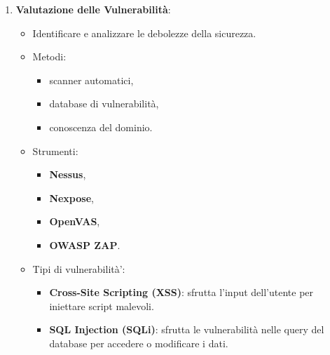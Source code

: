 \documentclass[12pt]{article}
\begin{document}
\begin{enumerate}
\begin{enumerate}
        \item \textbf{Valutazione delle Vulnerabilit\`{a}}:
        \begin{itemize}
            \item Identificare e analizzare le debolezze della sicurezza.
            \item Metodi: 
            \begin{itemize}
                \item scanner automatici,
                \item database di vulnerabilit\`{a},
                \item  conoscenza del dominio.
            \end{itemize}
            \item Strumenti: 
            \begin{itemize}
                \item \textbf{Nessus},
                \item \textbf{Nexpose},
                \item \textbf{OpenVAS},
                \item \textbf{OWASP ZAP}.
            \end{itemize}
            \item Tipi di vulnerabilit\`{a}':
            \begin{itemize}
                \item \textbf{Cross-Site Scripting (XSS)}: sfrutta l'input 
                dell'utente per iniettare script malevoli.
                \item \textbf{SQL Injection (SQLi)}: sfrutta le vulnerabilit\`{a} 
                nelle query del database per accedere o modificare i dati.
            \end{itemize}
        \end{itemize}
        

\end{enumerate}
\end{enumerate}
\end{document}
